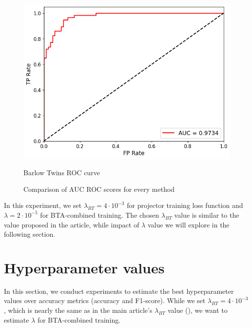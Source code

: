 \documentclass{article}
\begin{document}
\begin{figure}[htbp]
\begin{minipage}[t]{0.5\textwidth}
        \includegraphics[width=\linewidth]{fig/BTA-combined_roc-auc.png}
        \caption*{Barlow Twins ROC curve}
    \end{minipage}
    
    \caption{Comparison of AUC ROC scores for every method}
    \label{fig:experiment}
\end{figure}

In this experiment, we set $\lambda_{BT} = 4 \cdot 10^{-3}$ for projector training loss 
function and $\lambda = 2 \cdot 10^{-5}$ for BTA-combined training. The chosen $\lambda_{BT}$ 
value is similar to the value proposed in the \cite{zbontar2021barlow} article, while 
impact of $\lambda$ value we will explore in the following section.

\section{Hyperparameter values}\label{sec:hyperval}

In this section, we conduct experiments to estimate the best hyperparameter values 
over accuracy metrics (accuracy and F1-score). While we set 
$\lambda_{BT} = 4 \cdot 10^{-3}$, which is nearly the same as in the main article's 
$\lambda_{BT}$ value (\cite{zbontar2021barlow}), we want to estimate $\lambda$ for 
BTA-combined training.
\end{document}
